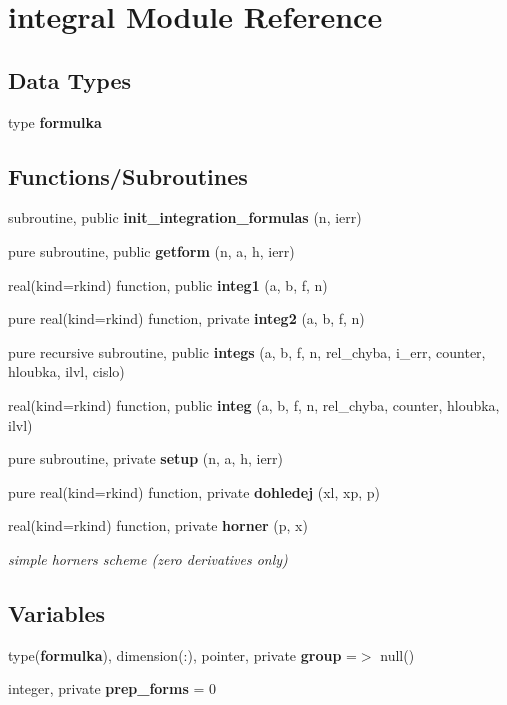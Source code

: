 \section{integral Module Reference}
\label{namespaceintegral}
\subsection*{Data Types}
\begin{DoxyCompactItemize}
\item 
type {\bf formulka}
\end{DoxyCompactItemize}
\subsection*{Functions/\+Subroutines}
\begin{DoxyCompactItemize}
\item 
subroutine, public {\bf init\+\_\+integration\+\_\+formulas} (n, ierr)
\item 
pure subroutine, public {\bf getform} (n, a, h, ierr)
\item 
real(kind=rkind) function, public {\bf integ1} (a, b, f, n)
\item 
pure real(kind=rkind) function, private {\bf integ2} (a, b, f, n)
\item 
pure recursive subroutine, public {\bf integs} (a, b, f, n, rel\+\_\+chyba, i\+\_\+err, counter, hloubka, ilvl, cislo)
\item 
real(kind=rkind) function, public {\bf integ} (a, b, f, n, rel\+\_\+chyba, counter, hloubka, ilvl)
\item 
pure subroutine, private {\bf setup} (n, a, h, ierr)
\item 
pure real(kind=rkind) function, private {\bf dohledej} (xl, xp, p)
\item 
real(kind=rkind) function, private {\bf horner} (p, x)
\begin{DoxyCompactList}\small\item\em simple horner\textquotesingle{}s scheme (zero derivatives only) \end{DoxyCompactList}\end{DoxyCompactItemize}
\subsection*{Variables}
\begin{DoxyCompactItemize}
\item 
type({\bf formulka}), dimension(\+:), pointer, private {\bf group} =$>$ null()
\item 
integer, private {\bf prep\+\_\+forms} = 0
\end{DoxyCompactItemize}


